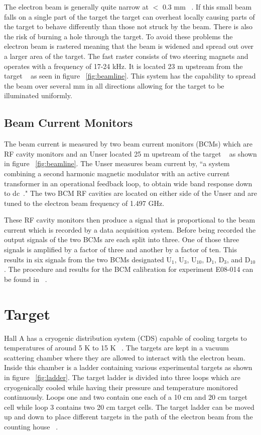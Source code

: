 The electron beam is generally quite narrow at $<$ 0.3 mm ~\cite{Thesis:Wang}. If this small beam falls on a single part of the target the target can overheat locally causing parts of the target to behave differently than those not struck by the beam. There is also the risk of burning a hole through the target. To avoid these problems the electron beam is rastered meaning that the beam is widened and spread out over a larger area of the target. The fast raster consists of two steering magnets and operates with a frequency of 17-24 kHz. It is located 23 m upstream from the target ~\cite{Article:HallA} as seen in figure ~\ref{fig:beamline}. This system has the capability to spread the beam over several mm in all directions allowing for the target to be illuminated uniformly. 

\subsection{Beam Current Monitors}
\label{ssec:bcms}

The beam current is measured by two beam current monitors (BCMs) which are RF cavity monitors and an Unser located 25 m upstream of the target ~\cite{Article:HallA} as shown in figure ~\ref{fig:beamline}. The Unser measures beam current by, ``a system combining a second harmonic magnetic modulator with an active current transformer in an operational feedback loop, to obtain wide band response down to dc~\cite{Article:Unser}." The two BCM RF cavities are located on either side of the Unser and are tuned to the electron beam frequency of 1.497 GHz. 

These RF cavity monitors then produce a signal that is proportional to the beam current which is recorded by a data acquisition system. Before being recorded the output signals of the two BCMs are each split into three. One of those three signals is amplified by a factor of three and another by a factor of ten. This results in six signals from the two BCMs designated U$_1$, U$_3$, U$_{10}$, D$_1$, D$_3$, and D$_{10}$. The procedure and results for the BCM calibration for experiment E08-014 can be found in ~\cite{bcm_calibration}. 

\section{Target}
\label{sec:target}

Hall A has a cryogenic distribution system (CDS) capable of cooling targets to temperatures of around 5 K to 15 K ~\cite{Article:HallA}. The targets are kept in a vacuum scattering chamber where they are allowed to interact with the electron beam. Inside this chamber is a ladder containing various experimental targets as shown in figure ~\ref{fig:ladder}. The target ladder is divided into three loops which are cryogenically cooled while having their pressure and temperature monitored continuously. Loops one and two contain one each of a 10 cm and 20 cm target cell while loop 3 contains two 20 cm target cells. The target ladder can be moved up and down to place different targets in the path of the electron beam from the counting house ~\cite{Thesis:Ye}.  

